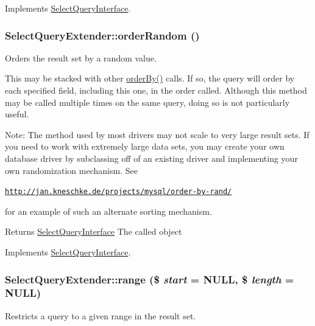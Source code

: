 Implements \hyperlink{interfaceSelectQueryInterface_a80eca1c7bc37fca0468b6526a3f303e7}{SelectQueryInterface}.\hypertarget{classSelectQueryExtender_afd183cab845d100b7890ff8cdfb380d4}{
\subsubsection[{orderRandom}]{\setlength{\rightskip}{0pt plus 5cm}SelectQueryExtender::orderRandom ()}}
\label{classSelectQueryExtender_afd183cab845d100b7890ff8cdfb380d4}
Orders the result set by a random value.

This may be stacked with other \hyperlink{classSelectQueryExtender_a7ed1e21116ca34f68a9d1c14e6c31096}{orderBy()} calls. If so, the query will order by each specified field, including this one, in the order called. Although this method may be called multiple times on the same query, doing so is not particularly useful.

Note: The method used by most drivers may not scale to very large result sets. If you need to work with extremely large data sets, you may create your own database driver by subclassing off of an existing driver and implementing your own randomization mechanism. See

\href{http://jan.kneschke.de/projects/mysql/order-by-rand/}{\tt http://jan.kneschke.de/projects/mysql/order-\/by-\/rand/}

for an example of such an alternate sorting mechanism.

\begin{DoxyReturn}{Returns}
\hyperlink{interfaceSelectQueryInterface}{SelectQueryInterface} The called object 
\end{DoxyReturn}


Implements \hyperlink{interfaceSelectQueryInterface_a647a3152b4cee89205bb9d7274ffd019}{SelectQueryInterface}.\hypertarget{classSelectQueryExtender_a83b472a48decf872faf61ded0c576697}{
\subsubsection[{range}]{\setlength{\rightskip}{0pt plus 5cm}SelectQueryExtender::range (\$ {\em start} = {\ttfamily NULL}, \/  \$ {\em length} = {\ttfamily NULL})}}
\label{classSelectQueryExtender_a83b472a48decf872faf61ded0c576697}
Restricts a query to a given range in the result set.

